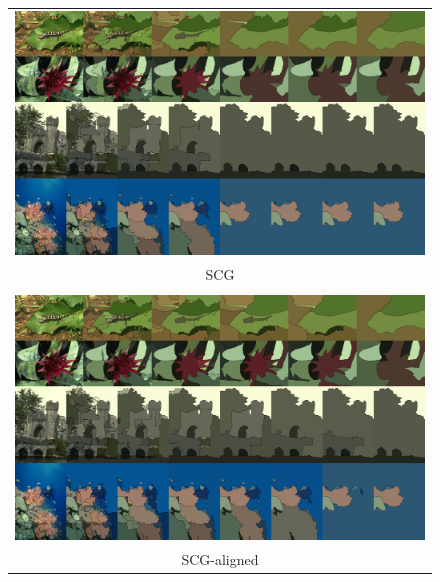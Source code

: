 \begin{figure}
\begin{center}
\begin{tabular}{c}
\includegraphics[width=17cm]{fig/smfig/stack_scg.png} \\
SCG\\ \\
\includegraphics[width=17cm]{fig/smfig/stack_scg_a.png}\\
SCG-aligned\\
\end{tabular}
\end{center}
\end{figure}

